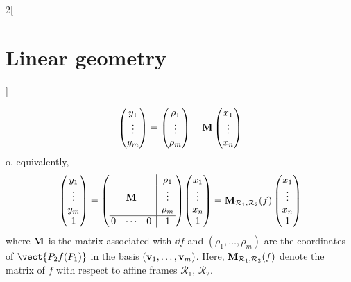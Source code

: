 \documentclass[../../../main.tex]{subfiles}
\begin{document}
\begin{multicols}{2}[\section{Linear geometry}]
\begin{proposition}
    $$
      \begin{pmatrix}
        y_1    \\
        \vdots \\
        y_m    \\
      \end{pmatrix}
      =
      \begin{pmatrix}
        \rho_1 \\
        \vdots \\
        \rho_m \\
      \end{pmatrix}
      +\boldsymbol{\mathrm{M}}
      \begin{pmatrix}
        x_1    \\
        \vdots \\
        x_n    \\
      \end{pmatrix}$$
    o, equivalently,
    $$
      \begin{pmatrix}
        y_1    \\
        \vdots \\
        y_m    \\
        1      \\
      \end{pmatrix}
      =\left(
      \begin{array}{@{\,}ccc|c@{\,}}
            &        &   & \rho_1 \\
            & \vf{M} &   & \vdots \\
            &        &   & \rho_m \\
          \hline
          0 & \cdots & 0 & 1
        \end{array}\right)\!
      \begin{pmatrix}
        x_1    \\
        \vdots \\
        x_n    \\
        1      \\
      \end{pmatrix}
      =\vf{M}_{\mathcal{R}_1,\mathcal{R}_2}(f)
      \begin{pmatrix}
        x_1    \\
        \vdots \\
        x_n    \\
        1      \\
      \end{pmatrix}$$
    where $\boldsymbol{\mathrm{M}}$ is the matrix associated with $\dd{f}$ and $(\rho_1,\ldots,\rho_m)$ are the coordinates of $\vect{P_2f(P_1)}$ in the basis $(\boldsymbol{\mathrm{v}}_1,\ldots,\boldsymbol{\mathrm{v}}_m)$. Here, $\boldsymbol{\mathrm{M}}_{\mathcal{R}_1,\mathcal{R}_2}(f)$ denote the matrix of $f$ with respect to affine frames $\mathcal{R}_1$, $\mathcal{R}_2$.
  \end{proposition}

\end{multicols}
\end{document}
